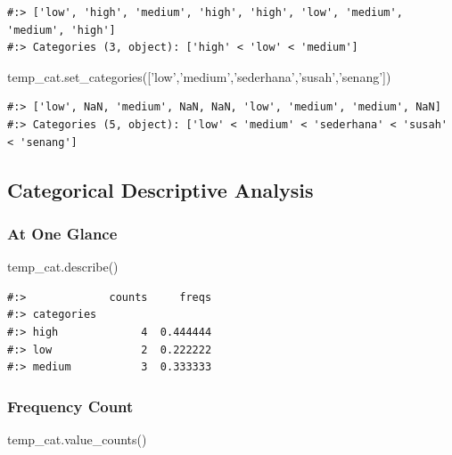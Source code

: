 \documentclass[
]{book}
\newenvironment{Shaded}{\begin{snugshade}}{\end{snugshade}}
\newcommand{\NormalTok}[1]{#1}
\newcommand{\StringTok}[1]{\textcolor[rgb]{0.5,0.5,0.5}{#1}}
\begin{document}
\begin{verbatim}
#:> ['low', 'high', 'medium', 'high', 'high', 'low', 'medium', 'medium', 'high']
#:> Categories (3, object): ['high' < 'low' < 'medium']
\end{verbatim}

\begin{Shaded}
\begin{Highlighting}[]
\NormalTok{temp_cat.set_categories([}\StringTok{'low'}\NormalTok{,}\StringTok{'medium'}\NormalTok{,}\StringTok{'sederhana'}\NormalTok{,}\StringTok{'susah'}\NormalTok{,}\StringTok{'senang'}\NormalTok{])}
\end{Highlighting}
\end{Shaded}

\begin{verbatim}
#:> ['low', NaN, 'medium', NaN, NaN, 'low', 'medium', 'medium', NaN]
#:> Categories (5, object): ['low' < 'medium' < 'sederhana' < 'susah' < 'senang']
\end{verbatim}

\hypertarget{categorical-descriptive-analysis}{%
\subsection{Categorical Descriptive Analysis}\label{categorical-descriptive-analysis}}

\hypertarget{at-one-glance}{%
\subsubsection{At One Glance}\label{at-one-glance}}

\begin{Shaded}
\begin{Highlighting}[]
\NormalTok{temp_cat.describe()}
\end{Highlighting}
\end{Shaded}

\begin{verbatim}
#:>             counts     freqs
#:> categories                  
#:> high             4  0.444444
#:> low              2  0.222222
#:> medium           3  0.333333
\end{verbatim}

\hypertarget{frequency-count}{%
\subsubsection{Frequency Count}\label{frequency-count}}

\begin{Shaded}
\begin{Highlighting}[]
\NormalTok{temp_cat.value_counts()}
\end{Highlighting}
\end{Shaded}
\end{document}
